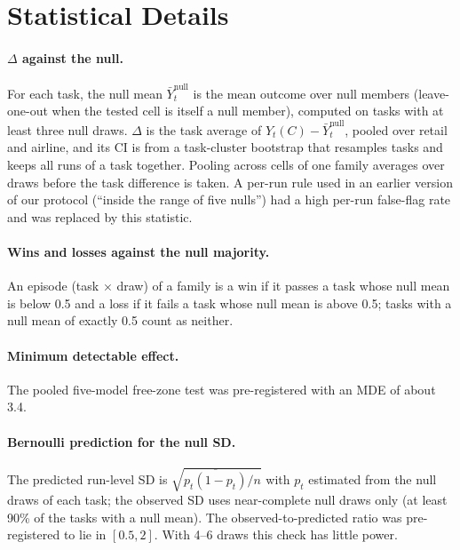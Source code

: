 \section{Statistical Details}
\label{app:stats}

\paragraph{$\Delta$ against the null.} For each task, the null mean $\bar Y_t^{\text{null}}$ is the mean outcome over null members (leave-one-out when the tested cell is itself a null member), computed on tasks with at least three null draws. $\Delta$ is the task average of $Y_t(C) - \bar Y_t^{\text{null}}$, pooled over retail and airline, and its CI is from a task-cluster bootstrap that resamples tasks and keeps all runs of a task together. Pooling across cells of one family averages over draws before the task difference is taken. A per-run rule used in an earlier version of our protocol (``inside the range of five nulls'') had a high per-run false-flag rate and was replaced by this statistic.

\paragraph{Wins and losses against the null majority.} An episode (task $\times$ draw) of a family is a win if it passes a task whose null mean is below 0.5 and a loss if it fails a task whose null mean is above 0.5; tasks with a null mean of exactly 0.5 count as neither.

\paragraph{Minimum detectable effect.} The pooled five-model free-zone test was pre-registered with an MDE of about 3.4\pp{}.

\paragraph{Bernoulli prediction for the null SD.} The predicted run-level SD is $\sqrt{\overline{p_t(1-p_t)}/n}$ with $p_t$ estimated from the null draws of each task; the observed SD uses near-complete null draws only (at least 90\% of the tasks with a null mean). The observed-to-predicted ratio was pre-registered to lie in $[0.5, 2]$. With 4--6 draws this check has little power. 

